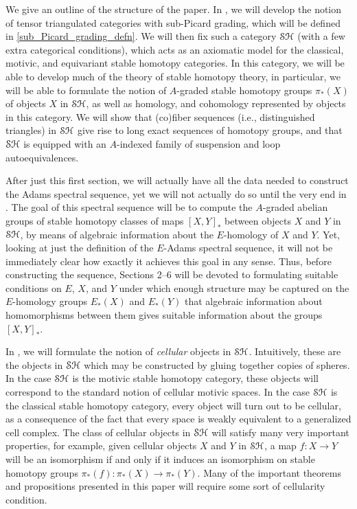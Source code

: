 \documentclass[../main.tex]{subfiles}
\begin{document}
We give an outline of the structure of the paper. In , we will develop the notion of tensor triangulated categories with sub-Picard grading, which will be defined in \autoref{sub_Picard_grading_defn}. We will then fix such a category $\mathcal{SH}$ (with a few extra categorical conditions), which acts as an axiomatic model for the classical, motivic, and equivariant stable homotopy categories. In this category, we will be able to develop much of the theory of stable homotopy theory, in particular, we will be able to formulate the notion of $A$-graded stable homotopy groups $\pi_*(X)$ of objects $X$ in $\mathcal{SH}$, as well as homology, and cohomology represented by objects in this category. We will show that (co)fiber sequences (i.e., distinguished triangles) in $\mathcal{SH}$ give rise to long exact sequences of homotopy groups, and that $\mathcal{SH}$ is equipped with an $A$-indexed family of suspension and loop autoequivalences.

After just this first section, we will actually have all the data needed to construct the Adams spectral sequence, yet we will not actually do so until the very end in . The goal of this spectral sequence will be to compute the $A$-graded abelian groups of stable homotopy classes of maps ${[X,Y]}_*$ between objects $X$ and $Y$ in $\mathcal{SH}$, by means of algebraic information about the $E$-homology of $X$ and $Y$. Yet, looking at just the definition of the $E$-Adams spectral sequence, it will not be immediately clear how exactly it achieves this goal in any sense. Thus, before constructing the sequence, Sections 2--6 will be devoted to formulating suitable conditions on $E$, $X$, and $Y$ under which enough structure may be captured on the $E$-homology groups $E_*(X)$ and $E_*(Y)$ that algebraic information about homomorphisms between them gives suitable information about the groups ${[X,Y]}_*$.

In , we will formulate the notion of \emph{cellular} objects in $\mathcal{SH}$. Intuitively, these are the objects in $\mathcal{SH}$ which may be constructed by gluing together copies of spheres. In the case $\mathcal{SH}$ is the motivic stable homotopy category, these objects will correspond to the standard notion of cellular motivic spaces. In the case $\mathcal{SH}$ is the classical stable homotopy category, every object will turn out to be cellular, as a consequence of the fact that every space is weakly equivalent to a generalized cell complex. The class of cellular objects in $\mathcal{SH}$ will satisfy many very important properties, for example, given cellular objects $X$ and $Y$ in $\mathcal{SH}$, a map $f:X\to Y$ will be an isomorphism if and only if it induces an isomorphism on stable homotopy groups $\pi_*(f):\pi_*(X)\to\pi_*(Y)$. Many of the important theorems and propositions presented in this paper will require some sort of cellularity condition.
\end{document}
